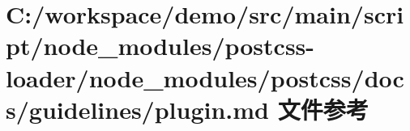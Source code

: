 \hypertarget{postcss-loader_2node__modules_2postcss_2docs_2guidelines_2plugin_8md}{}\section{C\+:/workspace/demo/src/main/script/node\+\_\+modules/postcss-\/loader/node\+\_\+modules/postcss/docs/guidelines/plugin.md 文件参考}
\label{postcss-loader_2node__modules_2postcss_2docs_2guidelines_2plugin_8md}
